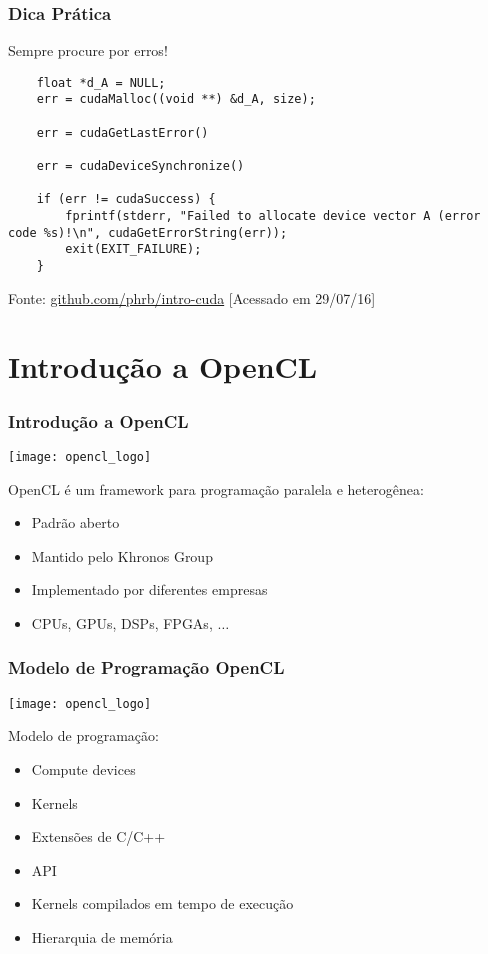\documentclass[10pt, compress]{beamer}
\begin{document}
\begin{frame}[fragile]
    \frametitle{Dica Prática}
    \alert{Sempre} procure por erros!

    \begin{lstlisting}
    float *d_A = NULL;
    err = cudaMalloc((void **) &d_A, size);

    err = cudaGetLastError()

    err = cudaDeviceSynchronize()

    if (err != cudaSuccess) {
        fprintf(stderr, "Failed to allocate device vector A (error code %s)!\n", cudaGetErrorString(err));
        exit(EXIT_FAILURE);
    }
    \end{lstlisting}

    \begin{center}
        \tiny{Fonte: \url{github.com/phrb/intro-cuda} [Acessado em 29/07/16]}
    \end{center}
\end{frame}

\section{Introdução a OpenCL}

\begin{frame}
    \frametitle{Introdução a OpenCL}
    \begin{center}
        \texttt{[image: opencl\_logo]}
    \end{center}
    OpenCL é um \alert{framework} para programação \alert{paralela} e
    \alert{heterogênea}:
    \begin{itemize}
        \item Padrão \alert{aberto}
        \item Mantido pelo \alert{Khronos Group}
        \item Implementado por \alert{diferentes empresas}
        \item CPUs, \alert{GPUs}, DSPs, FPGAs, $\dots$
    \end{itemize}
\end{frame}

\begin{frame}
    \frametitle{Modelo de Programação OpenCL}
    \begin{center}
        \texttt{[image: opencl\_logo]}
    \end{center}
    Modelo de programação:
    \begin{itemize}
        \item \alert{Compute devices}
        \item \alert{Kernels}
        \item Extensões de \alert{C/C++}
        \item \alert{API}
        \item Kernels compilados em \alert{tempo de execução}
        \item \alert{Hierarquia de memória}
    \end{itemize}
\end{frame}
\end{document}
